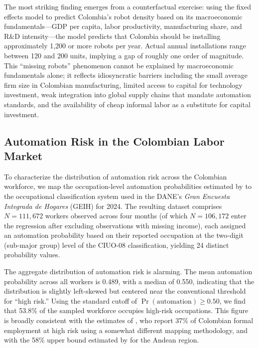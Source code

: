 \documentclass{article}
\begin{document}
The most striking finding emerges from a counterfactual exercise: using the fixed effects model to predict Colombia's robot density based on its macroeconomic fundamentals---GDP per capita, labor productivity, manufacturing share, and R\&D intensity---the model predicts that Colombia should be installing approximately 1,200 or more robots per year. Actual annual installations range between 120 and 200 units, implying a gap of roughly one order of magnitude. This ``missing robots'' phenomenon cannot be explained by macroeconomic fundamentals alone; it reflects idiosyncratic barriers including the small average firm size in Colombian manufacturing, limited access to capital for technology investment, weak integration into global supply chains that mandate automation standards, and the availability of cheap informal labor as a substitute for capital investment.

\subsection{Automation Risk in the Colombian Labor Market}
\label{subsec:risk_colombia}

To characterize the distribution of automation risk across the Colombian workforce, we map the occupation-level automation probabilities estimated by \cite{frey2017future} to the occupational classification system used in the DANE's \textit{Gran Encuesta Integrada de Hogares} (GEIH) for 2024. The resulting dataset comprises $N = 111{,}672$ workers observed across four months (of which $N = 106{,}172$ enter the regression after excluding observations with missing income), each assigned an automation probability based on their reported occupation at the two-digit (sub-major group) level of the CIUO-08 classification, yielding 24 distinct probability values.

The aggregate distribution of automation risk is alarming. The mean automation probability across all workers is 0.489, with a median of 0.550, indicating that the distribution is slightly left-skewed but centered near the conventional threshold for ``high risk.'' Using the standard cutoff of $\Pr(\text{automation}) \geq 0.50$, we find that 53.8\% of the sampled workforce occupies high-risk occupations. This figure is broadly consistent with the estimates of \cite{morales2023risk}, who report 37\% of Colombian formal employment at high risk using a somewhat different mapping methodology, and with the 58\% upper bound estimated by \cite{fedesarrollo2023} for the Andean region.
\end{document}
